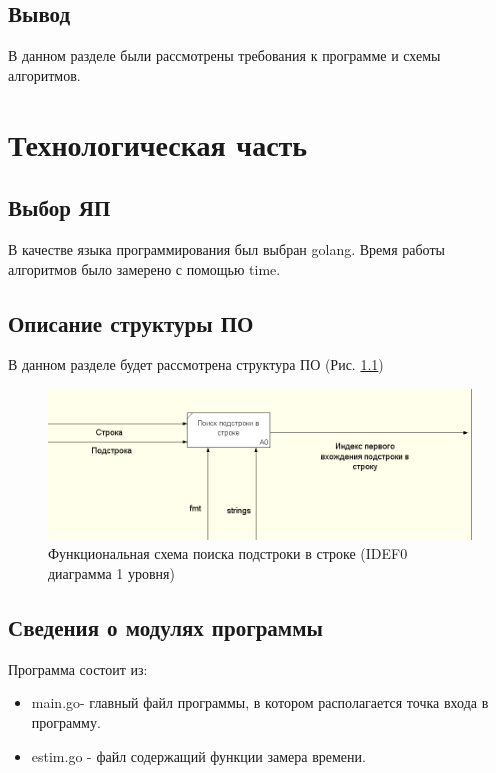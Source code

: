 \documentclass[12pt]{report}
\begin{document}
\section*{Вывод}
В данном разделе были рассмотрены требования к программе и схемы алгоритмов.


\chapter{Технологическая часть}

\section{Выбор ЯП}
В качестве языка программирования был выбран golang.
Время работы алгоритмов было замерено с помощью time. 
\section{Описание структуры ПО}
В данном разделе будет рассмотрена структура ПО (Рис. \ref{fig:mpr})
\begin{figure}[!htbp]
	\centering
	\includegraphics[width=1.1\linewidth]{lab07ram.png}
	\caption{Функциональная схема поиска подстроки в строке (IDEF0 диаграмма 1 уровня)}
	\label{fig:mpr}
\end{figure}
\section{Сведения о модулях программы}
Программа состоит из:
\begin{itemize}
	\item main.go- главный файл программы, в котором располагается точка входа в программу.
	\item estim.go - файл содержащий функции замера времени.
\end{itemize}
\end{document}
